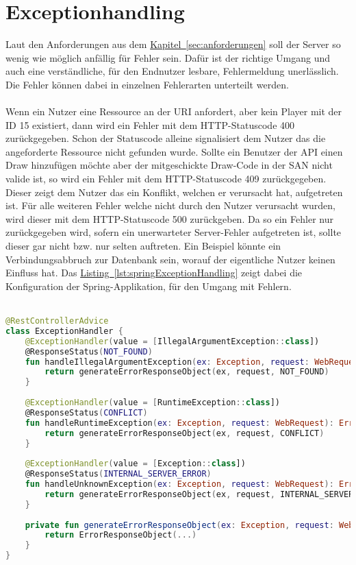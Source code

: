 \section{Exceptionhandling}
Laut den Anforderungen aus dem \hyperref[sec:anforderungen]{Kapitel~\ref{sec:anforderungen}} soll der Server so wenig wie möglich anfällig für Fehler sein. Dafür ist der richtige Umgang und auch eine verständliche, für den Endnutzer lesbare, Fehlermeldung unerlässlich. Die Fehler können dabei in einzelnen Fehlerarten unterteilt werden.\\
\\
Wenn ein Nutzer eine Ressource an der \gls{URI}  anfordert, aber kein Player mit der ID 15 existiert, dann wird ein Fehler mit dem \gls{HTTP}-Statuscode 400 zurückgegeben. Schon der Statuscode alleine signalisiert dem Nutzer das die angeforderte Ressource nicht gefunden wurde. Sollte ein Benutzer der \gls{API} einen Draw hinzufügen möchte aber der mitgeschickte Draw-Code in der \gls{SAN} nicht valide ist, so wird ein Fehler mit dem \gls{HTTP}-Statuscode 409 zurückgegeben. Dieser zeigt dem Nutzer das ein Konflikt, welchen er verursacht hat, aufgetreten ist. Für alle weiteren Fehler welche nicht durch den Nutzer verursacht wurden, wird dieser mit dem \gls{HTTP}-Statuscode 500 zurückgeben. Da so ein Fehler nur zurückgegeben wird, sofern ein unerwarteter Server-Fehler aufgetreten ist, sollte dieser gar nicht bzw. nur selten auftreten. Ein Beispiel könnte ein Verbindungsabbruch zur Datenbank sein, worauf der eigentliche Nutzer keinen Einfluss hat. Das \hyperref[lst:springExceptionHandling]{Listing~\ref{lst:springExceptionHandling}} zeigt dabei die Konfiguration der Spring-Applikation, für den Umgang mit Fehlern.\\
\\
\begin{lstlisting}[style=lstStyleFramed, language=Kotlin, caption={Spring-Konfiguration des Exceptionhandling}, label=lst:springExceptionHandling, float]
@RestControllerAdvice
class ExceptionHandler {
	@ExceptionHandler(value = [IllegalArgumentException::class])
	@ResponseStatus(NOT_FOUND)
	fun handleIllegalArgumentException(ex: Exception, request: WebRequest): ErrorResponseObject {
		return generateErrorResponseObject(ex, request, NOT_FOUND)
	}
	
	@ExceptionHandler(value = [RuntimeException::class])
	@ResponseStatus(CONFLICT)
	fun handleRuntimeException(ex: Exception, request: WebRequest): ErrorResponseObject {
		return generateErrorResponseObject(ex, request, CONFLICT)
	}
	
	@ExceptionHandler(value = [Exception::class])
	@ResponseStatus(INTERNAL_SERVER_ERROR)
	fun handleUnknownException(ex: Exception, request: WebRequest): ErrorResponseObject {
		return generateErrorResponseObject(ex, request, INTERNAL_SERVER_ERROR)
	}
	
	private fun generateErrorResponseObject(ex: Exception, request: WebRequest, statusCode: HttpStatus): ErrorResponseObject {
		return ErrorResponseObject(...)
	}
}
\end{lstlisting}

